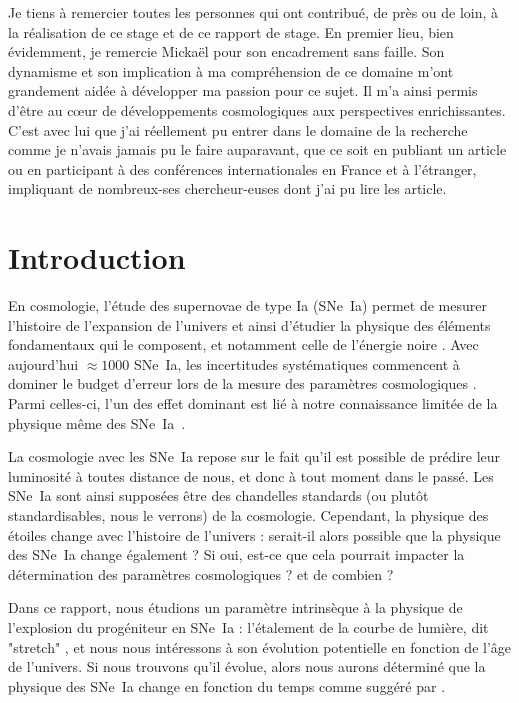 \documentclass[a4paper, 12pt, svgnames]{article}
\begin{document}

Je tiens à remercier toutes les personnes qui ont contribué, de près ou de loin,
à la réalisation de ce stage et de ce rapport de stage. En premier lieu, bien
évidemment, je remercie Mickaël  pour son encadrement sans faille.
Son dynamisme et son implication à ma compréhension de ce domaine m'ont
grandement aidée à développer ma passion pour ce sujet. Il m'a ainsi permis
d'être au cœur de développements cosmologiques aux perspectives enrichissantes.
C'est avec lui que j'ai réellement pu entrer dans le domaine de la recherche
comme je n'avais jamais pu le faire auparavant, que ce soit en publiant un
article ou en participant à des conférences internationales en France et à
l'étranger, impliquant de nombreux-ses chercheur-euses dont j'ai pu lire les
article.

\tableofcontents
\newpage

\section{Introduction}\label{sec:int}

En cosmologie, l'étude des supernovae de type Ia (SNe~Ia) permet de mesurer
l'histoire de l'expansion de l'univers et ainsi d'étudier la physique des
éléments fondamentaux qui le composent, et notamment celle de l'énergie noire
\cite{perlmutter_measurements_1999, riess_observational_1998}. Avec aujourd'hui
$\approx1000$ SNe~Ia, les incertitudes systématiques commencent à dominer le
budget d'erreur lors de la mesure des paramètres cosmologiques
\cite{betoule_improved_2014, scolnic_complete_2018}. Parmi celles-ci, l'un des
effet dominant est lié à notre connaissance limitée de la physique même des
SNe~Ia~\cite{sullivan_dependence_2010, rigault_evidence_2013,
rigault_confirmation_2015}.\bigbreak

La cosmologie avec les SNe~Ia repose sur le fait qu'il est possible de prédire
leur luminosité à toutes distance de nous, et donc à tout moment dans le passé.
Les SNe~Ia sont ainsi supposées être des chandelles standards (ou plutôt
standardisables, nous le verrons) de la cosmologie. Cependant, la physique des
étoiles change avec l'histoire de l'univers : serait-il alors possible que la
physique des SNe~Ia change également ? Si oui, est-ce que cela pourrait impacter
la détermination des paramètres cosmologiques ? et de combien ? \bigbreak

Dans ce rapport, nous étudions un paramètre intrinsèque à la physique de
l'explosion du progéniteur en SNe~Ia : l'étalement de la courbe de lumière, dit
"stretch" \cite{phillips_absolute_1999}, et nous nous intéressons à son
évolution potentielle en fonction de l'âge de l'univers. Si nous trouvons qu'il
évolue, alors nous aurons déterminé que la physique des SNe~Ia change en
fonction du temps comme suggéré par \cite{howell_effect_2009,
rigault_evidence_2013, childress_ages_2014, rigault_strong_2018}. \bigbreak
\end{document}
